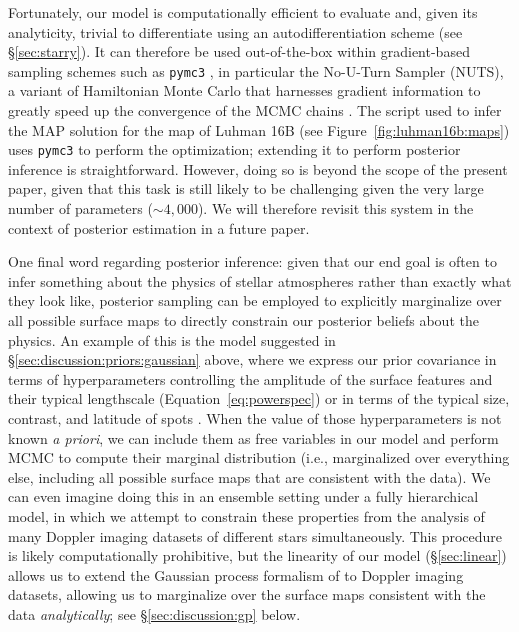 \documentclass[modern]{aastex631}
\begin{document}
Fortunately, our model is computationally efficient to evaluate and, given its analyticity, trivial to differentiate using an autodifferentiation scheme (see \S\ref{sec:starry}).
It can therefore be used out-of-the-box within gradient-based sampling schemes such as \texttt{pymc3} \citep{Salvatier2016}, in particular the No-U-Turn Sampler (NUTS), a variant of Hamiltonian Monte Carlo that harnesses gradient information to greatly speed up the convergence of the MCMC chains \citep[for a recent application of HMC in the context of spectroscopy, see][]{Kawahara2021}.
The script used to infer the MAP solution for the map of Luhman 16B (see Figure~\ref{fig:luhman16b:maps}) uses \texttt{pymc3} to perform the optimization; extending it to perform posterior inference is straightforward.
However, doing so is beyond the scope of the present paper, given that this task is still likely to be challenging given the very large number of parameters (${\sim}4{,}000$). 
We will therefore revisit this system in the context of posterior estimation in a future paper.

One final word regarding posterior inference: given that our end goal is often to infer something about the physics of stellar atmospheres rather than exactly what they look like, posterior sampling can be employed to explicitly marginalize over all possible surface maps to directly constrain our posterior beliefs about the physics.
An example of this is the model suggested in \S\ref{sec:discussion:priors:gaussian} above, where we express our prior covariance in terms of hyperparameters controlling the amplitude of the surface features and their typical lengthscale (Equation~\ref{eq:powerspec}) or in terms of the typical size, contrast, and latitude of spots \citep{Luger2021b,Luger2021d}.
When the value of those hyperparameters is not known \emph{a priori}, we can include them as free variables in our model and perform MCMC to compute their marginal distribution (i.e., marginalized over everything else, including all possible surface maps that are consistent with the data).
We can even imagine doing this in an ensemble setting under a fully hierarchical model, in which we attempt to constrain these properties from the analysis of many Doppler imaging datasets of different stars simultaneously.
This procedure is likely computationally prohibitive, but the linearity of our model (\S\ref{sec:linear}) allows us to extend the Gaussian process formalism of \citet{Luger2021b} to Doppler imaging datasets, allowing us to marginalize over the surface maps consistent with the data \emph{analytically}; see \S\ref{sec:discussion:gp} below.
\end{document}
